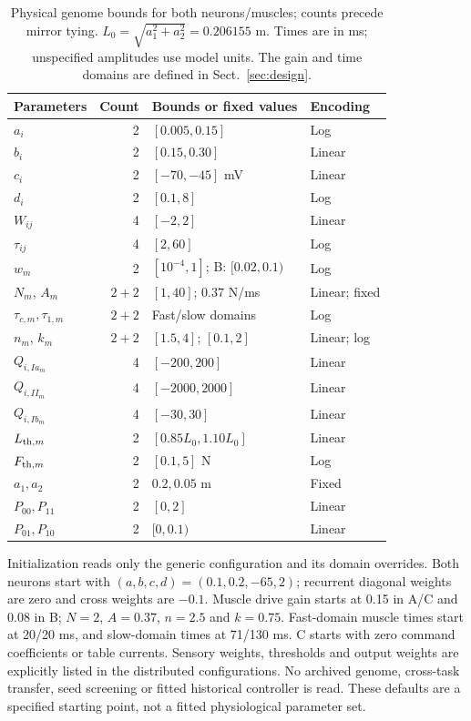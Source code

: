 \documentclass{styles/svproc}
\begin{document}
\begin{table}[tbp]
\caption{Physical genome bounds for both neurons/muscles; counts precede mirror tying. $L_0=\sqrt{a_1^2+a_2^2}=0.206155$ m. Times are in ms; unspecified amplitudes use model units. The gain and time domains are defined in Sect.~\ref{sec:design}.}
\label{tab:bounds}
\centering\small
\begin{tabular}{@{}lrll@{}}
\toprule
Parameters & Count & Bounds or fixed values & Encoding\\
\midrule
$a_i$ & 2 & $[0.005,0.15]$ & Log\\
$b_i$ & 2 & $[0.15,0.30]$ & Linear\\
$c_i$ & 2 & $[-70,-45]$ mV & Linear\\
$d_i$ & 2 & $[0.1,8]$ & Log\\
$W_{ij}$ & 4 & $[-2,2]$ & Linear\\
$\tau_{ij}$ & 4 & $[2,60]$ & Log\\
$w_m$ & 2 & $[10^{-4},1]$; B: $[0.02,0.1)$ & Log\\
$N_m$, $A_m$ & $2+2$ & $[1,40]$; $0.37$ N/ms & Linear; fixed\\
$\tau_{c,m},\tau_{1,m}$ & $2+2$ & Fast/slow domains & Log\\
$n_m$, $k_m$ & $2+2$ & $[1.5,4]$; $[0.1,2]$ & Linear; log\\
$Q_{i,Ia_m}$ & 4 & $[-200,200]$ & Linear\\
$Q_{i,II_m}$ & 4 & $[-2000,2000]$ & Linear\\
$Q_{i,Ib_m}$ & 4 & $[-30,30]$ & Linear\\
$L_{{\rm th},m}$ & 2 & $[0.85L_0,1.10L_0]$ & Linear\\
$F_{{\rm th},m}$ & 2 & $[0.1,5]$ N & Log\\
$a_1,a_2$ & 2 & $0.2,0.05$ m & Fixed\\
$P_{00},P_{11}$ & 2 & $[0,2]$ & Linear\\
$P_{01},P_{10}$ & 2 & $[0,0.1)$ & Linear\\
\bottomrule
\end{tabular}
\end{table}
Initialization reads only the generic configuration and its domain overrides. Both neurons start with $(a,b,c,d)=(0.1,0.2,-65,2)$; recurrent diagonal weights are zero and cross weights are $-0.1$. Muscle drive gain starts at 0.15 in A/C and 0.08 in B; $N=2$, $A=0.37$, $n=2.5$ and $k=0.75$. Fast-domain muscle times start at 20/20 ms, and slow-domain times at 71/130 ms. C starts with zero command coefficients or table currents. Sensory weights, thresholds and output weights are explicitly listed in the distributed configurations. No archived genome, cross-task transfer, seed screening or fitted historical controller is read. These defaults are a specified starting point, not a fitted physiological parameter set.
\end{document}
